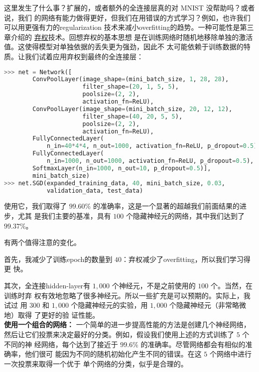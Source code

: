 \label{final_conv}
这里发生了什么事？扩展的，或者额外的全连接层真的对 MNIST 没帮助吗？或者说，我们
的网络有能力做得更好，但我们在用错误的方式学习？例如，也许我们可以用更强有力的\gls*{regularization}%
技术来减小\gls*{overfitting}的趋势。一种可能性是第三章介绍的%
\hyperref[sec:other_techniques_for_regularization]{弃权}技术。回想弃权的基本思想
是在训练网络时随机地移除单独的激活值。这使得模型对单独依据的丢失更为强劲，因此不
太可能依赖于训练数据的特质。让我们试着应用弃权到最终的全连接层：
\begin{lstlisting}[language=Python]
>>> net = Network([
        ConvPoolLayer(image_shape=(mini_batch_size, 1, 28, 28), 
                      filter_shape=(20, 1, 5, 5), 
                      poolsize=(2, 2), 
                      activation_fn=ReLU),
        ConvPoolLayer(image_shape=(mini_batch_size, 20, 12, 12), 
                      filter_shape=(40, 20, 5, 5), 
                      poolsize=(2, 2), 
                      activation_fn=ReLU),
        FullyConnectedLayer(
            n_in=40*4*4, n_out=1000, activation_fn=ReLU, p_dropout=0.5),
        FullyConnectedLayer(
            n_in=1000, n_out=1000, activation_fn=ReLU, p_dropout=0.5),
        SoftmaxLayer(n_in=1000, n_out=10, p_dropout=0.5)], 
        mini_batch_size)
>>> net.SGD(expanded_training_data, 40, mini_batch_size, 0.03, 
            validation_data, test_data)
\end{lstlisting}

使用它，我们取得了 $99.60$\% 的准确率，这是一个显著的超越我们前面结果的进步，尤其
是我们主要的基准，具有 $100$ 个隐藏神经元的网络，其中我们达到了 $99.37$\%。

有两个值得注意的变化。

首先，我减少了训练\gls*{epoch}的数量到 $40$：弃权减少了\gls*{overfitting}，所以我们学习得更
快。

其次，全连接\gls*{hidden-layer}有 $1,000$ 个神经元，不是之前使用的 $100$ 个。当然，在训练时弃
权有效地忽略了很多神经元。所以一些扩充是可以预期的。实际上，我试过
用 $300$ 和 $1,000$ 个隐藏神经元的实验，用 $1,000$ 个隐藏神经元（非常略微地）取得
了更好的验
证性能。\\

\textbf{使用一个组合的网络：} 一个简单的进一步提高性能的方法是创建几个神经网络，
然后让它们投票来决定最好的分类。例如，假设我们使用上述的方式训练了 $5$ 个不同的神
经网络，每个达到了接近于 $99.6$\% 的准确率。尽管网络都会有相似的准确率，他们很可
能因为不同的随机初始化产生不同的错误。在这 $5$ 个网络中进行一次投票来取得一个优于
单个网络的分类，似乎是合理的。

